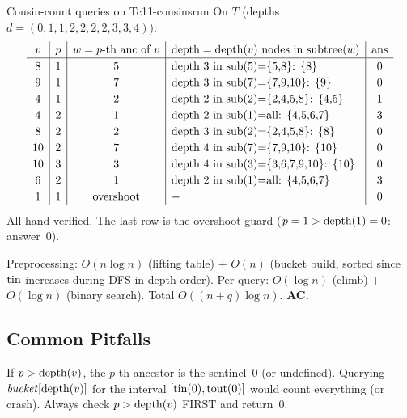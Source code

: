 \begin{example}{Cousin-count queries on T}{c11-cousinsrun}
On \(T\) (depths \(d = (0,1,1,2,2,2,2,3,3,4)\)):
\[
\renewcommand{\arraystretch}{1.2}
\begin{array}{c|c|c|l|c}
v & p & w = \text{\(p\)-th anc of \(v\)}
  & \text{depth}=\depth(v)\text{ nodes in subtree}(w) & \text{ans} \\ \hline
8 & 1 & 5  & \text{depth~3 in sub(5)=\{5,8\}: \{8\}} & 0 \\
9 & 1 & 7  & \text{depth~3 in sub(7)=\{7,9,10\}: \{9\}} & 0 \\
4 & 1 & 2  & \text{depth~2 in sub(2)=\{2,4,5,8\}: \{4,5\}} & 1 \\
4 & 2 & 1  & \text{depth~2 in sub(1)=all: \{4,5,6,7\}} & 3 \\
8 & 2 & 2  & \text{depth~3 in sub(2)=\{2,4,5,8\}: \{8\}} & 0 \\
10& 2 & 7  & \text{depth~4 in sub(7)=\{7,9,10\}: \{10\}} & 0 \\
10& 3 & 3  & \text{depth~4 in sub(3)=\{3,6,7,9,10\}: \{10\}} & 0 \\
6 & 2 & 1  & \text{depth~2 in sub(1)=all: \{4,5,6,7\}} & 3 \\
1 & 1 & \text{overshoot} & - & 0 \\
\end{array}
\]
All hand-verified.  The last row is the overshoot guard (\(p=1 >
\operatorname{depth}(1)=0\): answer~0).
\end{example}

\begin{complexitybox}
Preprocessing: \(O(n\log n)\) (lifting table) + \(O(n)\) (bucket build,
sorted since \(\operatorname{tin}\) increases during DFS in depth order).
Per query: \(O(\log n)\) (climb) + \(O(\log n)\) (binary search).
Total \(O((n+q)\log n)\).  \textbf{AC.}
\end{complexitybox}

\subsection{Common Pitfalls}

\begin{warningbox}
If \(p > \operatorname{depth}(v)\), the \(p\)-th ancestor is the sentinel~0 (or
undefined).  Querying \(\mathit{bucket}[\operatorname{depth}(v)]\) for the interval
\([\operatorname{tin}(0), \operatorname{tout}(0)]\) would count everything (or crash).  Always
check \(p > \operatorname{depth}(v)\) FIRST and return~0.
\end{warningbox}

